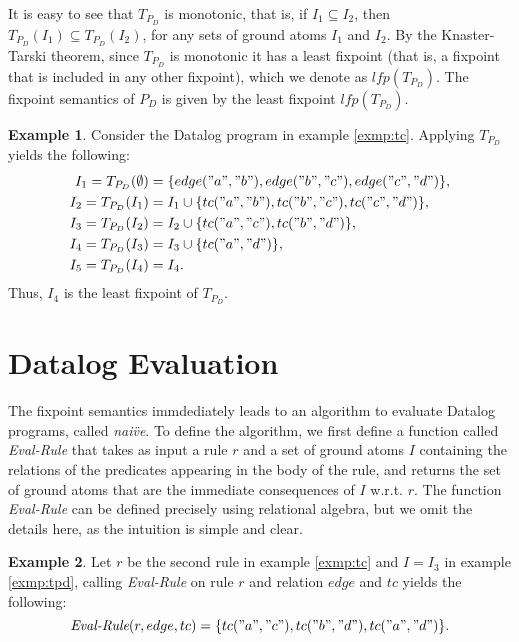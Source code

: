 \documentclass[twoside,11pt,openright]{report}
\theoremstyle{definition}
\newtheorem{exmp}{Example}[chapter]
\begin{document}
It is easy to see that $T_{P_D}$ is monotonic, that is, if $I_1 \subseteq I_2$, then $T_{P_D}(I_1) \subseteq T_{P_D}(I_2)$,
for any sets of ground atoms $I_1$ and $I_2$. By the Knaster-Tarski theorem, since $T_{P_D}$ is monotonic
it has a least fixpoint (that is, a fixpoint that is included in any other fixpoint), which we denote as
$\textit{lfp}(T_{P_D})$. The fixpoint semantics of $P_D$ is given by the least fixpoint $\textit{lfp}(T_{P_D})$.

\begin{exmp}
  Consider the Datalog program in example \ref{exmp:tc}. Applying $T_{P_D}$ yields the following:
  \begin{align*}
    I_1 = T_{P_D}(\emptyset) & = \{edge("a", "b"), edge("b", "c"), edge("c", "d")\},    \\
    I_2 = T_{P_D}(I_1)       & = I_1 \cup \{tc("a", "b"), tc("b", "c"), tc("c", "d")\}, \\
    I_3 = T_{P_D}(I_2)       & = I_2 \cup \{tc("a", "c"), tc("b", "d")\},               \\
    I_4 = T_{P_D}(I_3)       & = I_3 \cup \{tc("a", "d")\},                             \\
    I_5 = T_{P_D}(I_4)       & = I_4.
  \end{align*}
  Thus, $I_4$ is the least fixpoint of $T_{P_D}$.
\end{exmp}
\label{exmp:tpd}

\section{Datalog Evaluation}

The fixpoint semantics immdediately leads to an algorithm to evaluate Datalog programs, called \textit{nai\"ve}.
To define the algorithm, we first define a function called \textit{Eval-Rule} that takes as input a rule $r$ and a set of ground atoms $I$
containing the relations of the predicates appearing in the body of the rule, and returns the set of ground atoms that are the immediate consequences
of $I$ w.r.t. $r$. The function \textit{Eval-Rule} can be defined precisely using relational algebra, but we omit the details here,
as the intuition is simple and clear.

\begin{exmp}
  Let $r$ be the second rule in example \ref{exmp:tc} and $I = I_3$ in example \ref{exmp:tpd}, calling \textit{Eval-Rule}
  on rule $r$ and relation $edge$ and $tc$ yields the following:
  $$
    \textit{Eval-Rule}(r, edge, tc) = \{tc("a", "c"), tc("b", "d"), tc("a", "d")\}.
  $$
\end{exmp}
\label{exmp:eval-rule}
\end{document}
